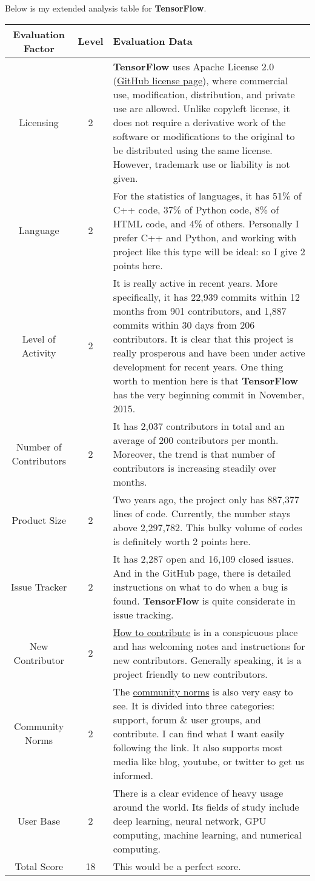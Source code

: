 \documentclass[11pt]{article}
\begin{document}
Below is my extended analysis table for \textbf{TensorFlow}.


\begin{tabular}{|c|c|p{4in}|} 
\hline
Evaluation Factor & Level & Evaluation Data \\
\hline
Licensing & 2 & \textbf{TensorFlow} uses Apache License 2.0 (\href{https://github.com/tensorflow/tensorflow/blob/master/LICENSE}{GitHub license page}), where commercial use, modification, distribution, and private use are allowed. Unlike copyleft license, it does not require a derivative work of the software or modifications to the original to be distributed using the same license. However, trademark use or liability is not given.\\
\hline
Language & 2 & For the statistics of languages, it has 51\% of C++ code, 37\% of Python code, 8\% of HTML code, and 4\% of others. Personally I prefer C++ and Python, and working with project like this type will be ideal: so I give 2 points here.\\
\hline
Level of Activity & 2 & It is really active in recent years. More specifically, it has 22,939 commits within 12 months from 901 contributors, and 1,887 commits within 30 days from 206 contributors. It is clear that this project is really prosperous and have been under active development for recent years. One thing worth to mention here is that \textbf{TensorFlow} has the very beginning commit in November, 2015.\\
\hline
Number of Contributors & 2 & It has 2,037 contributors in total and an average of 200 contributors per month. Moreover, the trend is that number of contributors is increasing steadily over months.\\
\hline
Product Size & 2 & Two years ago, the project only has 887,377 lines of code. Currently, the number stays above 2,297,782. This bulky volume of codes is definitely worth 2 points here.\\
\hline
Issue Tracker & 2 & It has 2,287 open and 16,109 closed issues. And in the GitHub page, there is detailed instructions on what to do when a bug is found. \textbf{TensorFlow} is quite considerate in issue tracking.\\
\hline
New Contributor & 2 & \href{https://www.tensorflow.org/community/contribute}{How to contribute} is in a conspicuous place and has welcoming notes and instructions for new contributors. Generally speaking, it is a project friendly to new contributors.\\
\hline
Community Norms & 2 & The \href{https://www.tensorflow.org/community}{community norms} is also very easy to see. It is divided into three categories: support, forum \& user groups, and contribute. I can find what I want easily following the link. It also supports most media like blog, youtube, or twitter to get us informed.\\
\hline
User Base & 2 & There is a clear evidence of heavy usage around the world. Its fields of study include deep learning, neural network, GPU computing, machine learning, and numerical computing.\\
\hline
Total Score & 18 & This would be a perfect score.\\
\hline
\end{tabular}
\end{document}
